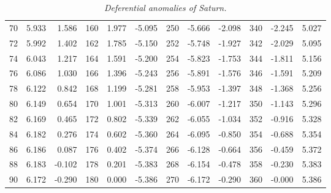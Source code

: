 \begin{table}
{\begin{tabular}{rrr|rrr|rrr|rrr}
 70 &   5.933 &  1.586 & 160 &   1.977 & -5.095 & 250 &  -5.666 & -2.098 & 340 &  -2.245 &  5.027\\
 72 &   5.992 &  1.402 & 162 &   1.785 & -5.150 & 252 &  -5.748 & -1.927 & 342 &  -2.029 &  5.095\\
 74 &   6.043 &  1.217 & 164 &   1.591 & -5.200 & 254 &  -5.823 & -1.753 & 344 &  -1.811 &  5.156\\
 76 &   6.086 &  1.030 & 166 &   1.396 & -5.243 & 256 &  -5.891 & -1.576 & 346 &  -1.591 &  5.209\\
 78 &   6.122 &  0.842 & 168 &   1.199 & -5.281 & 258 &  -5.953 & -1.397 & 348 &  -1.368 &  5.256\\
 80 &   6.149 &  0.654 & 170 &   1.001 & -5.313 & 260 &  -6.007 & -1.217 & 350 &  -1.143 &  5.296\\
 82 &   6.169 &  0.465 & 172 &   0.802 & -5.339 & 262 &  -6.055 & -1.034 & 352 &  -0.916 &  5.328\\
 84 &   6.182 &  0.276 & 174 &   0.602 & -5.360 & 264 &  -6.095 & -0.850 & 354 &  -0.688 &  5.354\\
 86 &   6.186 &  0.087 & 176 &   0.402 & -5.374 & 266 &  -6.128 & -0.664 & 356 &  -0.459 &  5.372\\
 88 &   6.183 & -0.102 & 178 &   0.201 & -5.383 & 268 &  -6.154 & -0.478 & 358 &  -0.230 &  5.383\\
 90 &   6.172 & -0.290 & 180 &   0.000 & -5.386 & 270 &  -6.172 & -0.290 & 360 &  -0.000 &  5.386\\
\end{tabular}}
\caption{\em Deferential anomalies of Saturn.}\label{vt15}
\end{table}

